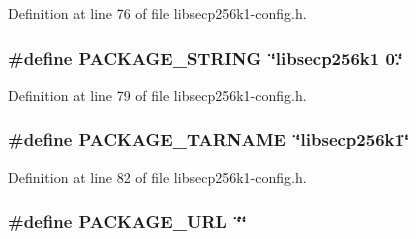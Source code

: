 Definition at line 76 of file libsecp256k1-\/config.\+h.

\hypertarget{libsecp256k1-config_8h_ac73e6f903c16eca7710f92e36e1c6fbf}{}
\subsubsection[{P\+A\+C\+K\+A\+G\+E\+\_\+\+S\+T\+R\+I\+N\+G}]{\setlength{\rightskip}{0pt plus 5cm}\#define P\+A\+C\+K\+A\+G\+E\+\_\+\+S\+T\+R\+I\+N\+G~\char`\"{}libsecp256k1 0.\char`\"{}}\label{libsecp256k1-config_8h_ac73e6f903c16eca7710f92e36e1c6fbf}


Definition at line 79 of file libsecp256k1-\/config.\+h.

\hypertarget{libsecp256k1-config_8h_af415af6bfede0e8d5453708afe68651c}{}
\subsubsection[{P\+A\+C\+K\+A\+G\+E\+\_\+\+T\+A\+R\+N\+A\+M\+E}]{\setlength{\rightskip}{0pt plus 5cm}\#define P\+A\+C\+K\+A\+G\+E\+\_\+\+T\+A\+R\+N\+A\+M\+E~\char`\"{}libsecp256k1\char`\"{}}\label{libsecp256k1-config_8h_af415af6bfede0e8d5453708afe68651c}


Definition at line 82 of file libsecp256k1-\/config.\+h.

\hypertarget{libsecp256k1-config_8h_a5c93853116d5a50307b6744f147840aa}{}
\subsubsection[{P\+A\+C\+K\+A\+G\+E\+\_\+\+U\+R\+L}]{\setlength{\rightskip}{0pt plus 5cm}\#define P\+A\+C\+K\+A\+G\+E\+\_\+\+U\+R\+L~\char`\"{}\char`\"{}}\label{libsecp256k1-config_8h_a5c93853116d5a50307b6744f147840aa}


